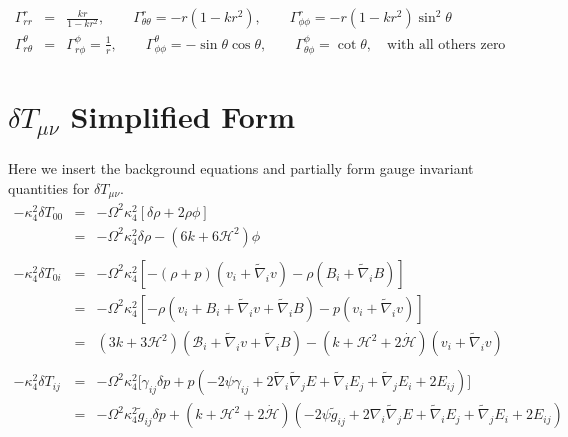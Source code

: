 \documentclass[10pt,letterpaper]{article}
\numberwithin{equation}{section}
\begin{document}
\begin{appendices}
\begin{eqnarray}
\Gamma^r_{rr} &=& \frac{kr}{1-kr^2},\qquad \Gamma^r_{\theta\theta} = -r(1-kr^2),\qquad \Gamma^r_{\phi\phi} = -r(1-kr^2)\sin^2\theta
\nonumber\\
\Gamma^\theta_{r\theta} &=& \Gamma^{\phi}_{r\phi} = \frac{1}{r},\qquad \Gamma^{\theta}_{\phi\phi} = -\sin\theta\cos\theta, \qquad \Gamma^{\phi}_{\theta\phi} = \cot\theta,\quad\text{with all others zero}
\end{eqnarray}

\section{$\delta T_{\mu\nu}$ Simplified Form}
Here we insert the background equations and partially form gauge invariant quantities for $\delta T_{\mu\nu}$.
\begin{eqnarray}
-\kappa^2_4 \delta T_{00} &=& -\Omega^2 \kappa^2_4\left[  \delta \rho + 2\rho \phi  \right]
\nonumber\\
&=& -\Omega^2 \kappa^2_4 \delta \rho - (6k+6\mathcal H^2)\phi
\nonumber\\
\nonumber\\
-\kappa^2_4 \delta T_{0i} &=& -\Omega^2 \kappa^2_4\left[ -(\rho+p)(v_i +\tilde\nabla_i v)-\rho(B_i +\tilde\nabla_i B) \right]
\nonumber\\
&=&  -\Omega^2 \kappa^2_4\left[ -\rho(v_i +B_i +\tilde\nabla_i v+\tilde\nabla_i B) - p (v_i  +\tilde\nabla_i v ) \right]
\nonumber\\
&=& (3k+3\mathcal H^2)(\mathcal B_i +\tilde\nabla_i v+\tilde\nabla_i B) -(k+\mathcal H^2 + 2\dot{\mathcal H}) (v_i +\tilde\nabla_i v )
\nonumber\\
\nonumber\\
-\kappa^2_4 \delta T_{ij} &=& -\Omega^2 \kappa^2_4 \bigg[  
 \gamma_{ij} \delta p + p(-2\psi \gamma_{ij} + 2\tilde\nabla_i \tilde\nabla_j E + \tilde\nabla_i E_j + \tilde\nabla_j E_i + 2E_{ij})\bigg]
\nonumber\\
 &=& -\Omega^2 \kappa^2_4 \tilde g_{ij} \delta p + (k+\mathcal H^2 + 2\dot{\mathcal H})(-2\psi \tilde g_{ij} + 2\nabla_i \tilde\nabla_j E + \tilde\nabla_i E_j + \tilde\nabla_j E_i + 2E_{ij})
\end{eqnarray}


\end{appendices}
\end{document}
